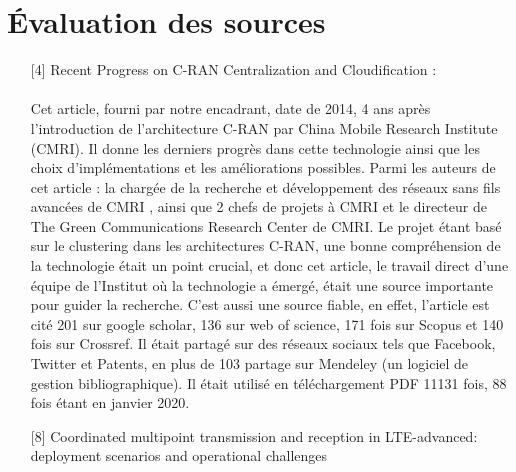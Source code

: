 \documentclass{article}
\begin{document}
\section{Évaluation des sources}
\begin{itemize}
  \item [{[4]}] Recent Progress on C-RAN Centralization and Cloudification :
  \paragraph{}

  Cet article, fourni par notre encadrant, date de 2014, 4 ans après l'introduction 
  de l'architecture C-RAN par China Mobile Research Institute (CMRI). Il donne les 
  derniers progrès dans cette technologie ainsi que les choix d’implémentations et 
  les améliorations possibles. Parmi les auteurs de cet article : la chargée de la 
  recherche et développement des réseaux sans fils avancées de CMRI , ainsi que 2 chefs 
  de projets à CMRI et le directeur de The Green Communications Research Center de CMRI. 
  Le projet étant basé sur le clustering dans les architectures C-RAN, une bonne compréhension 
  de la technologie était un point crucial, et donc cet article, le travail direct d’une équipe 
  de l'Institut où la technologie a émergé, était une source importante pour guider la recherche.
  C'est aussi une source fiable, en effet, l'article est cité 201 sur google scholar, 136 sur web of science, 171 fois sur 
  Scopus et 140 fois sur Crossref. Il était partagé sur des réseaux sociaux tels que Facebook, Twitter et Patents, en plus de  
  103 partage sur Mendeley (un logiciel de gestion bibliographique). Il était utilisé en téléchargement PDF 11131 fois, 
  88 fois étant en janvier 2020. \\
  \item [{[8]}] Coordinated multipoint transmission and reception in LTE-advanced: deployment scenarios and operational challenges

\end{itemize}
\end{document}
